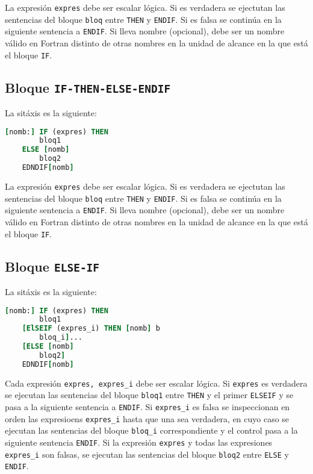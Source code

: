 La expresión \texttt{expres} debe ser escalar lógica. Si es verdadera se ejectutan las sentencias del bloque \texttt{bloq} entre \texttt{THEN} y \texttt{ENDIF}. Si es falsa se continúa en la siguiente sentencia a \texttt{ENDIF}. Si lleva nombre (opcional), debe ser un nombre válido en Fortran distinto de otras nombres en la unidad de alcance en la que está el bloque \texttt{IF}.


\subsection{Bloque {\tt IF-THEN-ELSE-ENDIF}}
La sitáxis es la siguiente:

\begin{lstlisting}[language=Fortran]
	[nomb:] IF (expres) THEN 
		bloq1 
	ELSE [nomb] 
		bloq2 
	EDNDIF[nomb] 
\end{lstlisting}

La expresión \texttt{expres} debe ser escalar lógica. Si es verdadera se ejectutan las sentencias del bloque \texttt{bloq} entre \texttt{THEN} y \texttt{ENDIF}. Si es falsa se continúa en la siguiente sentencia a \texttt{ENDIF}. Si lleva nombre (opcional), debe ser un nombre válido en Fortran distinto de otras nombres en la unidad de alcance en la que está el bloque \texttt{IF}.


\subsection{Bloque {\tt ELSE-IF}}

La sitáxis es la siguiente:

\begin{lstlisting}[language=Fortran]
	[nomb:] IF (expres) THEN 
		bloq1 
	[ElSEIF (expres_i) THEN [nomb] b
		bloq_i]...
	[ELSE [nomb]
		bloq2]
	EDNDIF[nomb] 
\end{lstlisting}

Cada expresión {\tt expres, expres\_i} debe ser escalar lógica. Si {\tt expres} es verdadera se ejecutan las sentencias del bloque {\tt bloq1} entre {\tt THEN} y el primer {\tt ELSEIF} y se pasa a la siguiente sentencia a \texttt{ENDIF}. Si \texttt{expres\_i} es falsa se inspeccionan en orden las expresioens \texttt{expres\_i} hasta que una sea verdadera, en cuyo caso se ejecutan las sentencias del bloque {\tt bloq\_i} correspondiente y el control pasa a la siguiente sentencia \texttt{ENDIF}. Si la expresión {\tt expres} y todas las expresiones {\tt expres\_i} son falsas, se ejecutan las sentencias del bloque \texttt{bloq2} entre {\tt ELSE} y {\tt ENDIF}. \\

